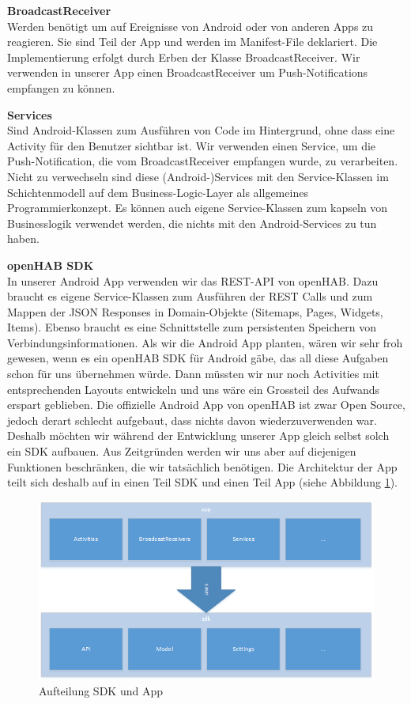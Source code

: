 \textbf{BroadcastReceiver}\\
Werden benötigt um auf Ereignisse von Android oder von anderen Apps zu reagieren. Sie sind Teil der App und werden im Manifest-File deklariert. Die Implementierung erfolgt durch Erben der Klasse BroadcastReceiver. Wir verwenden in unserer App einen BroadcastReceiver um Push-Notifications empfangen zu können.

\textbf{Services}\\
Sind Android-Klassen zum Ausführen von Code im Hintergrund, ohne dass eine Activity für den Benutzer sichtbar ist. Wir verwenden einen Service, um die Push-Notification, die vom BroadcastReceiver empfangen wurde, zu verarbeiten. Nicht zu verwechseln sind diese (Android-)Services mit den Service-Klassen im Schichtenmodell auf dem Business-Logic-Layer als allgemeines Programmierkonzept. Es können auch eigene Service-Klassen zum kapseln von Businesslogik verwendet werden, die nichts mit den Android-Services zu tun haben.

\textbf{openHAB SDK}\\
In unserer Android App verwenden wir das REST-API von openHAB. Dazu braucht es eigene Service-Klassen zum Ausführen der REST Calls und zum Mappen der JSON Responses in Domain-Objekte (Sitemaps, Pages, Widgets, Items). Ebenso braucht es eine Schnittstelle zum persistenten Speichern von Verbindungsinformationen. Als wir die Android App planten, wären wir sehr froh gewesen, wenn es ein openHAB SDK für Android gäbe, das all diese Aufgaben schon für uns übernehmen würde. Dann müssten wir nur noch Activities mit entsprechenden Layouts entwickeln und uns wäre ein Grossteil des Aufwands erspart geblieben. Die offizielle Android App von openHAB ist zwar Open Source, jedoch derart schlecht aufgebaut, dass nichts davon wiederzuverwenden war. Deshalb möchten wir während der Entwicklung unserer App gleich selbst solch ein SDK aufbauen. Aus Zeitgründen werden wir uns aber auf diejenigen Funktionen beschränken, die wir tatsächlich benötigen. Die Architektur der App teilt sich deshalb auf in einen Teil SDK und einen Teil App (siehe Abbildung \ref{fig:androidArchSdk}). 

\begin{figure}[H]
	\centering
		\includegraphics[width=\textwidth]{report/img/android_arch_sdk.png}
	\caption{Aufteilung SDK und App}
	\label{fig:androidArchSdk}
\end{figure}


